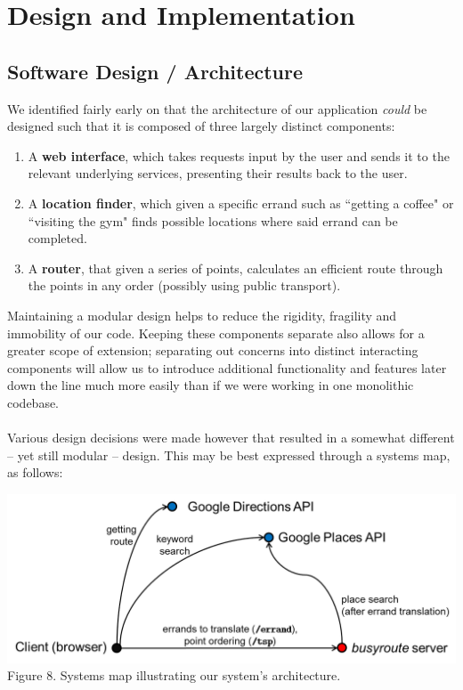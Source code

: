 \documentclass[a4paper, 10pt]{report}
\begin{document}
\chapter{Design and Implementation}
\section{Software Design / Architecture}
We identified fairly early on that the architecture of our application \textit{could} be designed such that it is composed of three largely distinct components:
\begin{enumerate}
\item A \textbf{web interface}, which takes requests input by the user and sends it to the relevant underlying services, presenting their results back to the user.
\item A \textbf{location finder}, which given a specific errand such as ``getting a coffee" or ``visiting the gym" finds possible locations where said errand can be completed.
\item A \textbf{router}, that given a series of points, calculates an efficient route through the points in any order (possibly using public transport).
\end{enumerate}
Maintaining a modular design helps to reduce the rigidity, fragility and immobility of our code. \cite{separate-concerns} Keeping these components separate also allows for a greater scope of extension; separating out concerns into distinct interacting components will allow us to introduce additional functionality and features later down the line much more easily than if we were working in one monolithic codebase. \cite{separate-concerns-2}\\\\
Various design decisions were made however that resulted in a somewhat different -- yet still modular -- design. This may be best expressed through a systems map, as follows:
\begin{center}
\includegraphics[scale=.6]{systems_map.png} \\
Figure 8. Systems map illustrating our system's architecture.
\end{center}
\end{document}
